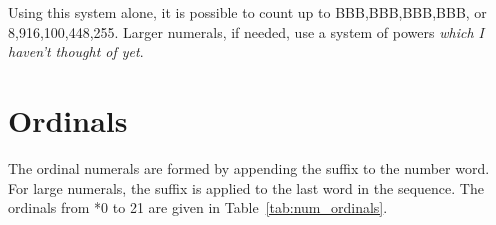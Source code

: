 \documentclass[grammar]{subfiles}
\begin{document}
  Using this system alone, it is possible to count up to BBB,BBB,BBB,BBB\duo, or 8,916,100,448,255\dec. Larger numerals, if needed, use a system of powers \emph{which I haven't thought of yet}.

  \section{Ordinals}
  \label{sec:num_ordinals}

  The ordinal numerals are formed by appending the suffix  to the number word. For large numerals, the suffix is applied to the last word in the sequence. The ordinals from *0 to 21\dec{} are given in Table~\ref{tab:num_ordinals}.

  \begin{table}[htpb]\small\capstart
      \qquad
      \caption{Ordinal numerals from 0\dec\ to 21\dec\label{tab:num_ordinals}}
  \end{table}
\end{document}

